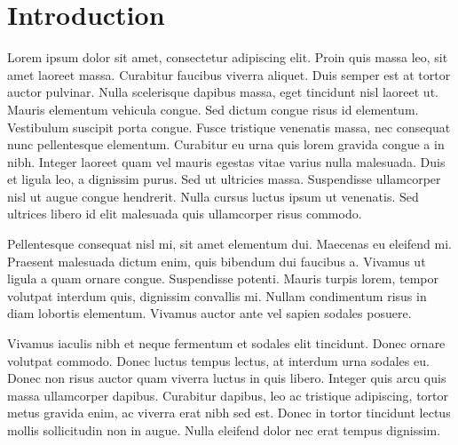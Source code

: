\chapter*{Introduction}
Lorem ipsum dolor sit amet, consectetur adipiscing elit. Proin quis massa leo, sit amet laoreet massa. Curabitur faucibus viverra aliquet. Duis semper est at tortor auctor pulvinar. Nulla scelerisque dapibus massa, eget tincidunt nisl laoreet ut. Mauris elementum vehicula congue. Sed dictum congue risus id elementum. Vestibulum suscipit porta congue. Fusce tristique venenatis massa, nec consequat nunc pellentesque elementum. Curabitur eu urna quis lorem gravida congue a in nibh. Integer laoreet quam vel mauris egestas vitae varius nulla malesuada. Duis et ligula leo, a dignissim purus. Sed ut ultricies massa. Suspendisse ullamcorper nisl ut augue congue hendrerit. Nulla cursus luctus ipsum ut venenatis. Sed ultrices libero id elit malesuada quis ullamcorper risus commodo.

Pellentesque consequat nisl mi, sit amet elementum dui. Maecenas eu eleifend mi. Praesent malesuada dictum enim, quis bibendum dui faucibus a. Vivamus ut ligula a quam ornare congue. Suspendisse potenti. Mauris turpis lorem, tempor volutpat interdum quis, dignissim convallis mi. Nullam condimentum risus in diam lobortis elementum. Vivamus auctor ante vel sapien sodales posuere.

Vivamus iaculis nibh et neque fermentum et sodales elit tincidunt. Donec ornare volutpat commodo. Donec luctus tempus lectus, at interdum urna sodales eu. Donec non risus auctor quam viverra luctus in quis libero. Integer quis arcu quis massa ullamcorper dapibus. Curabitur dapibus, leo ac tristique adipiscing, tortor metus gravida enim, ac viverra erat nibh sed est. Donec in tortor tincidunt lectus mollis sollicitudin non in augue. Nulla eleifend dolor nec erat tempus dignissim. 
